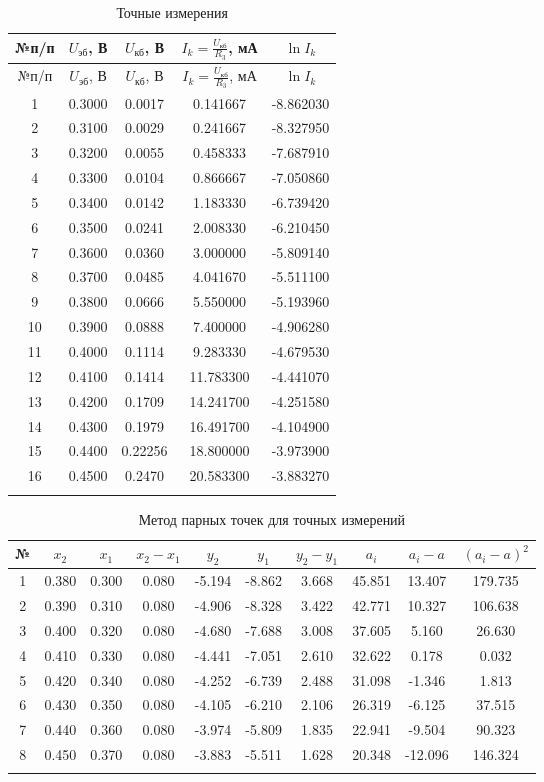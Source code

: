 \begin{longtable}{|c|c|c|c|c|}
\hline
№п/п & $U_{\text{эб}}$, В & $U_{\text{кб}}$, В & $I_k = \frac{U_{\text{кб}}}{R_3}$, мА & $\ln I_k$ \\
\hline
\endfirsthead
\hline
№п/п & $U_{эб}$, В & $U_{кб}$, В & $I_k = \frac{U_{кб}}{R_3}$, мА & $\ln I_k$ \\
\hline
\endhead
\hline
1 & 0.3000 & 0.0017 & 0.141667 & -8.862030 \\
2 & 0.3100 & 0.0029 & 0.241667 & -8.327950 \\
3 & 0.3200 & 0.0055 & 0.458333 & -7.687910 \\
4 & 0.3300 & 0.0104 & 0.866667 & -7.050860 \\
5 & 0.3400 & 0.0142 & 1.183330 & -6.739420 \\
6 & 0.3500 & 0.0241 & 2.008330 & -6.210450 \\
7 & 0.3600 & 0.0360 & 3.000000 & -5.809140 \\
8 & 0.3700 & 0.0485 & 4.041670 & -5.511100 \\
9 & 0.3800 & 0.0666 & 5.550000 & -5.193960 \\
10 & 0.3900 & 0.0888 & 7.400000 & -4.906280 \\
11 & 0.4000 & 0.1114 & 9.283330 & -4.679530 \\
12 & 0.4100 & 0.1414 & 11.783300 & -4.441070 \\
13 & 0.4200 & 0.1709 & 14.241700 & -4.251580 \\
14 & 0.4300 & 0.1979 & 16.491700 & -4.104900 \\
15 & 0.4400 & 0.22256 & 18.800000 & -3.973900 \\
16 & 0.4500 & 0.2470 & 20.583300 & -3.883270 \\
\hline
\caption{Точные измерения}
\end{longtable}



\begin{longtable}{|c|c|c|c|c|c|c|c|c|c|}
\hline
№ & $x_2$ & $x_1$ & $x_2 - x_1$ & $y_2$ & $y_1$ & $y_2 - y_1$ & $a_i$ & $a_i - a$ & $(a_i - a)^2$ \\
\hline
\endhead
\hline
1 & 0.380 & 0.300 & 0.080 & -5.194 & -8.862 & 3.668 & 45.851 & 13.407 & 179.735 \\
2 & 0.390 & 0.310 & 0.080 & -4.906 & -8.328 & 3.422 & 42.771 & 10.327 & 106.638 \\
3 & 0.400 & 0.320 & 0.080 & -4.680 & -7.688 & 3.008 & 37.605 & 5.160 & 26.630 \\
4 & 0.410 & 0.330 & 0.080 & -4.441 & -7.051 & 2.610 & 32.622 & 0.178 & 0.032 \\
5 & 0.420 & 0.340 & 0.080 & -4.252 & -6.739 & 2.488 & 31.098 & -1.346 & 1.813 \\
6 & 0.430 & 0.350 & 0.080 & -4.105 & -6.210 & 2.106 & 26.319 & -6.125 & 37.515 \\
7 & 0.440 & 0.360 & 0.080 & -3.974 & -5.809 & 1.835 & 22.941 & -9.504 & 90.323 \\
8 & 0.450 & 0.370 & 0.080 & -3.883 & -5.511 & 1.628 & 20.348 & -12.096 & 146.324 \\
\hline
\caption{Метод парных точек для точных измерений}
\end{longtable}

